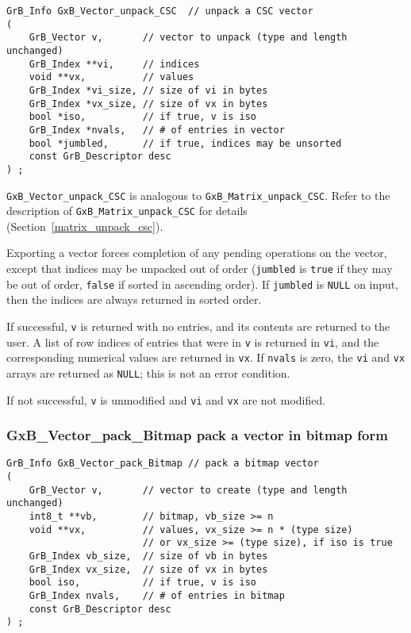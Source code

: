 \documentclass[12pt]{article}
\begin{document}
{\begin{mdframed}[userdefinedwidth=6in]
{\footnotesize
\begin{verbatim}
GrB_Info GxB_Vector_unpack_CSC  // unpack a CSC vector
(
    GrB_Vector v,       // vector to unpack (type and length unchanged)
    GrB_Index **vi,     // indices
    void **vx,          // values
    GrB_Index *vi_size, // size of vi in bytes
    GrB_Index *vx_size, // size of vx in bytes
    bool *iso,          // if true, v is iso
    GrB_Index *nvals,   // # of entries in vector
    bool *jumbled,      // if true, indices may be unsorted
    const GrB_Descriptor desc
) ;
\end{verbatim}
} \end{mdframed}

\verb'GxB_Vector_unpack_CSC' is analogous to \verb'GxB_Matrix_unpack_CSC'.
Refer to the description of \verb'GxB_Matrix_unpack_CSC' for details
(Section~\ref{matrix_unpack_csc}).

Exporting a vector forces completion of any pending operations on the vector,
except that indices may be unpacked out of order (\verb'jumbled' is \verb'true'
if they may be out of order, \verb'false' if sorted in ascending order).  If
\verb'jumbled' is \verb'NULL' on input, then the indices are always returned in
sorted order.

If successful, \verb'v' is returned with no entries, and its contents are
returned to the user.
A list of row indices of entries that were in
\verb'v' is returned in \verb'vi', and the corresponding numerical values are
returned in \verb'vx'.  If \verb'nvals' is zero, the \verb'vi' and \verb'vx'
arrays are returned as \verb'NULL'; this is not an error condition.

If not successful, \verb'v' is unmodified and \verb'vi' and \verb'vx' are
not modified.

\newpage
\subsubsection{{\sf GxB\_Vector\_pack\_Bitmap} pack a vector in bitmap form}
\label{vector_pack_bitmap}

\begin{mdframed}[userdefinedwidth=6in]
{\footnotesize
\begin{verbatim}
GrB_Info GxB_Vector_pack_Bitmap // pack a bitmap vector
(
    GrB_Vector v,       // vector to create (type and length unchanged)
    int8_t **vb,        // bitmap, vb_size >= n
    void **vx,          // values, vx_size >= n * (type size)
                        // or vx_size >= (type size), if iso is true
    GrB_Index vb_size,  // size of vb in bytes
    GrB_Index vx_size,  // size of vx in bytes
    bool iso,           // if true, v is iso
    GrB_Index nvals,    // # of entries in bitmap
    const GrB_Descriptor desc
) ;
\end{verbatim}
} \end{mdframed}

}
\end{document}
